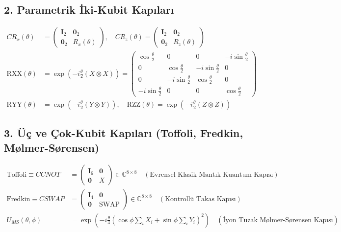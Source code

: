 \documentclass[11pt, a4paper]{article}
\begin{document}
\subsection{2. Parametrik İki-Kubit Kapıları}
\begin{align}
CR_x(\theta) &= \begin{pmatrix} \mathbf{I}_2 & \mathbf{0}_2 \\ \mathbf{0}_2 & R_x(\theta) \end{pmatrix}, \quad CR_z(\theta) = \begin{pmatrix} \mathbf{I}_2 & \mathbf{0}_2 \\ \mathbf{0}_2 & R_z(\theta) \end{pmatrix} \\
\text{RXX}(\theta) &= \exp\left(-i \frac{\theta}{2} (X \otimes X)\right) = \begin{pmatrix} \cos\frac{\theta}{2} & 0 & 0 & -i\sin\frac{\theta}{2} \\ 0 & \cos\frac{\theta}{2} & -i\sin\frac{\theta}{2} & 0 \\ 0 & -i\sin\frac{\theta}{2} & \cos\frac{\theta}{2} & 0 \\ -i\sin\frac{\theta}{2} & 0 & 0 & \cos\frac{\theta}{2} \end{pmatrix} \\
\text{RYY}(\theta) &= \exp\left(-i \frac{\theta}{2} (Y \otimes Y)\right), \quad \text{RZZ}(\theta) = \exp\left(-i \frac{\theta}{2} (Z \otimes Z)\right)
\end{align}

\subsection{3. Üç ve Çok-Kubit Kapıları (Toffoli, Fredkin, Mølmer-Sørensen)}
\begin{align}
\text{Toffoli} \equiv CCNOT &= \begin{pmatrix} \mathbf{I}_6 & \mathbf{0} \\ \mathbf{0} & X \end{pmatrix} \in \mathbb{C}^{8 \times 8} \quad (\text{Evrensel Klasik Mantık Kuantum Kapısı}) \\
\text{Fredkin} \equiv CSWAP &= \begin{pmatrix} \mathbf{I}_4 & \mathbf{0} \\ \mathbf{0} & \text{SWAP} \end{pmatrix} \in \mathbb{C}^{8 \times 8} \quad (\text{Kontrollü Takas Kapısı}) \\
U_{MS}(\theta, \phi) &= \exp\left( -i \frac{\theta}{4} \left( \cos\phi \sum_i X_i + \sin\phi \sum_i Y_i \right)^2 \right) \quad (\text{İyon Tuzak Mølmer-Sørensen Kapısı})
\end{align}
\end{document}
